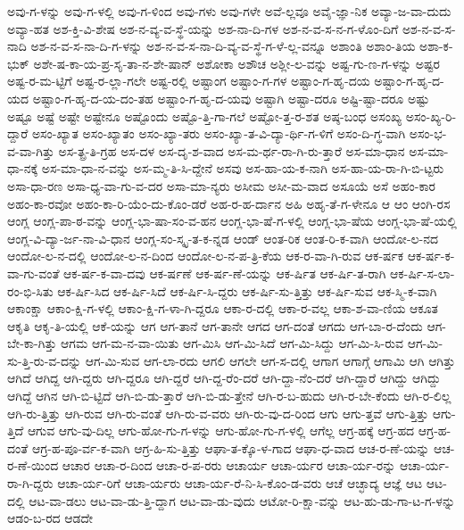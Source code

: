 {ಅವು-ಗ-ಳನ್ನು
ಅವು-ಗ-ಳಲ್ಲಿ
ಅವು-ಗ-ಳಿಂದ
ಅವು-ಗಳು
ಅವು-ಗಳೇ
ಅವೆ-ಲ್ಲವೂ
ಅವೈ-ಜ್ಞಾ-ನಿಕ
ಅವ್ಯಾ-ಜ-ವಾ-ದುದು
ಅವ್ಯಾ-ಹತ
ಅಶ-ಕ್ತಿ-ವಿ-ಶೇಷ
ಅಶ-ನ-ವ್ಯ-ವ-ಸ್ಥೆ-ಯನ್ನು
ಅಶ-ನಾ-ದಿ-ಗಳ
ಅಶ-ನ-ವ-ಸ-ನ-ಗ-ಳೊಂ-ದಿಗೆ
ಅಶ-ನ-ವ-ಸ-ನಾದಿ
ಅಶ-ನ-ವ-ಸ-ನಾ-ದಿ-ಗ-ಳನ್ನು
ಅಶ-ನ-ವ-ಸ-ನಾ-ದಿ-ವ್ಯ-ವ-ಸ್ಥೆ-ಗ-ಳೆ-ಲ್ಲ-ವನ್ನೂ
ಅಶಾಂತಿ
ಅಶಾಂ-ತಿಯ
ಅಶಾ-ಕ-ಭುಕ್
ಅಶೇ-ಷ-ಕಾ-ಯ-ಪ್ರ-ಸೃ-ತಾ-ನ-ಶೇ-ಷಾನ್
ಅಶೋಕಾ
ಅಶೌಚ
ಅಶ್ಲೀ-ಲ-ವನ್ನು
ಅಷ್ಟ-ಗು-ಣ-ಗ-ಳನ್ನು
ಅಷ್ಟರ
ಅಷ್ಟ-ರ-ಮ-ಟ್ಟಿಗೆ
ಅಷ್ಟ-ರ-ಲ್ಲಾ-ಗಲೇ
ಅಷ್ಟ-ರಲ್ಲಿ
ಅಷ್ಟಾಂಗ
ಅಷ್ಟಾಂ-ಗ-ಗಳ
ಅಷ್ಟಾಂ-ಗ-ಹೃ-ದಯ
ಅಷ್ಟಾಂ-ಗ-ಹೃ-ದ-ಯದ
ಅಷ್ಟಾಂ-ಗ-ಹೃ-ದ-ಯ-ದಂ-ತಹ
ಅಷ್ಟಾಂ-ಗ-ಹೃ-ದ-ಯವು
ಅಷ್ಟಾಗಿ
ಅಷ್ಟಾ-ದರೂ
ಅಷ್ಟಿ-ಷ್ಟಾ-ದರೂ
ಅಷ್ಟು
ಅಷ್ಟೂ
ಅಷ್ಟೆ
ಅಷ್ಟೇ
ಅಷ್ಟೇನೂ
ಅಷ್ಟೊಂದು
ಅಷ್ಟೊ-ತ್ತಿ-ಗಾ-ಗಲೆ
ಅಷ್ಟೋ-ತ್ತ-ರ-ಶತ
ಅಷ್ಠ-ಬಂಧ
ಅಸಂಖ್ಯ
ಅಸಂ-ಖ್ಯ-ರಿ-ದ್ದಾರೆ
ಅಸಂ-ಖ್ಯಾತ
ಅಸಂ-ಖ್ಯಾತಂ
ಅಸಂ-ಖ್ಯಾ-ತರು
ಅಸಂ-ಖ್ಯಾ-ತ-ವಿ-ದ್ಯಾ-ರ್ಥಿ-ಗ-ಳಿಗೆ
ಅಸಂ-ದಿ-ಗ್ಧ-ವಾಗಿ
ಅಸಂ-ಭ-ವ-ವಾ-ಗಿತ್ತು
ಅಸ-ತ್ಪ್ರ-ತಿ-ಗ್ರಹ
ಅಸ-ದಳ
ಅಸ-ದೃ-ಶ-ವಾದ
ಅಸ-ಮ-ರ್ಥ-ರಾ-ಗಿ-ರು-ತ್ತಾರೆ
ಅಸ-ಮಾ-ಧಾನ
ಅಸ-ಮಾ-ಧಾ-ನಕ್ಕೆ
ಅಸ-ಮಾ-ಧಾ-ನ-ವನ್ನು
ಅಸ-ಮ್ಮ-ತಿ-ಸಿ-ದ್ದೇನೆ
ಅಸವು
ಅಸ-ಹಾ-ಯ-ಕ-ನಾಗಿ
ಅಸ-ಹಾ-ಯ-ರಾ-ಗಿ-ಬಿ-ಟ್ಟರು
ಅಸಾ-ಧಾ-ರಣ
ಅಸಾ-ಧ್ಯ-ವಾ-ಗು-ವ-ದರ
ಅಸಾ-ಮಾ-ನ್ಯರು
ಅಸೀಮ
ಅಸೀ-ಮ-ವಾದ
ಅಸೂಯೆ
ಅಸೆ
ಅಹಂ-ಕಾರ
ಅಹಂ-ಕಾ-ರವೋ
ಅಹಂ-ಕಾ-ರಿ-ಯೆಂ-ದು-ಕೊಂ-ಡರೆ
ಅಹ-ರ-ಹ-ರ್ದಾನ
ಅಹಿ
ಅಹೃ-ತೆ-ಗ-ಳೇನೂ
ಆ
ಆಂ
ಆಂಗಿ-ರಸ
ಆಂಗ್ಲ
ಆಂಗ್ಲ-ಪಾ-ಠ-ವನ್ನು
ಆಂಗ್ಲ-ಭಾ-ಷಾ-ಸಂ-ವ-ಹನ
ಆಂಗ್ಲ-ಭಾ-ಷೆ-ಗ-ಳಲ್ಲಿ
ಆಂಗ್ಲ-ಭಾ-ಷೆಯ
ಆಂಗ್ಲ-ಭಾ-ಷೆ-ಯಲ್ಲಿ
ಆಂಗ್ಲ-ವಿ-ದ್ಯಾ-ರ್ಜ-ನಾ-ವಿ-ಧಾನ
ಆಂಗ್ಲ-ಸಂ-ಸ್ಕೃ-ತ-ಕ-ನ್ನಡ
ಆಂಡ್
ಆಂತ-ರಿಕ
ಆಂತ-ರಿ-ಕ-ವಾಗಿ
ಆಂದೋ-ಲ-ನದ
ಆಂದೋ-ಲ-ನ-ದಲ್ಲಿ
ಆಂದೋ-ಲ-ನ-ದಿಂದ
ಆಂದೋ-ಲ-ನ-ಪ-ತ್ರಿ-ಕೆಯ
ಆಕ-ರ-ವಾ-ಗಿ-ರುವ
ಆಕ-ರ್ಷಕ
ಆಕ-ರ್ಷ-ಕ-ವಾ-ಗು-ವಂತೆ
ಆಕ-ರ್ಷ-ಕ-ವಾ-ದವು
ಆಕ-ರ್ಷಣೆ
ಆಕ-ರ್ಷ-ಣೆ-ಯನ್ನು
ಆಕ-ರ್ಷಿತ
ಆಕ-ರ್ಷಿ-ತ-ರಾಗಿ
ಆಕ-ರ್ಷಿ-ಸ-ಲಾ-ರಂ-ಭಿ-ಸಿತು
ಆಕ-ರ್ಷಿ-ಸಿದ
ಆಕ-ರ್ಷಿ-ಸಿದೆ
ಆಕ-ರ್ಷಿ-ಸಿ-ದ್ದರು
ಆಕ-ರ್ಷಿ-ಸು-ತ್ತಿತ್ತು
ಆಕ-ರ್ಷಿ-ಸುವ
ಆಕ-ಸ್ಮಿ-ಕ-ವಾಗಿ
ಆಕಾಂಕ್ಷಾ
ಆಕಾಂ-ಕ್ಷಿ-ಗ-ಳಲ್ಲಿ
ಆಕಾಂ-ಕ್ಷಿ-ಗ-ಳಾ-ಗಿ-ದ್ದರೂ
ಆಕಾ-ರ-ದಲ್ಲಿ
ಆಕಾ-ರ-ವಲ್ಲ
ಆಕಾ-ಶ-ವಾ-ಣಿಯ
ಆಕೂತ
ಆಕೃತಿ
ಆಕೃ-ತಿ-ಯಲ್ಲಿ
ಆಕೆ-ಯನ್ನು
ಆಗ
ಆಗ-ತಾನೆ
ಆಗ-ತಾನೇ
ಆಗದ
ಆಗ-ದಂತೆ
ಆಗದು
ಆಗ-ಬಾ-ರ-ದೆಂದು
ಆಗ-ಬೇ-ಕಾ-ಗಿತ್ತು
ಆಗಮ
ಆಗ-ಮ-ನ-ವಾ-ಯಿತು
ಆಗ-ಮಿಸಿ
ಆಗ-ಮಿ-ಸಿದೆ
ಆಗ-ಮಿ-ಸಿದ್ದು
ಆಗ-ಮಿ-ಸಿ-ರುವ
ಆಗ-ಮಿ-ಸು-ತ್ತಿ-ರು-ವ-ದನ್ನು
ಆಗ-ಮಿ-ಸುವ
ಆಗ-ಲಾ-ರದು
ಆಗಲಿ
ಆಗಲೇ
ಆಗ-ಸ-ದಲ್ಲಿ
ಆಗಾಗ
ಆಗಾಗ್ಗೆ
ಆಗಾಮಿ
ಆಗಿ
ಆಗಿತ್ತು
ಆಗಿದೆ
ಆಗಿದ್ದ
ಆಗಿ-ದ್ದರು
ಆಗಿ-ದ್ದರೂ
ಆಗಿ-ದ್ದರೆ
ಆಗಿ-ದ್ದ-ರೆಂ-ದರೆ
ಆಗಿ-ದ್ದಾ-ನೆಂ-ದರೆ
ಆಗಿ-ದ್ದಾರೆ
ಆಗಿದ್ದು
ಆಗಿದ್ದು
ಆಗಿದ್ದೆ
ಆಗಿನ
ಆಗಿ-ಬಿ-ಟ್ಟಿದೆ
ಆಗಿ-ಬಿ-ಡು-ತ್ತಾರೆ
ಆಗಿ-ಬಿ-ಡು-ತ್ತೇನೆ
ಆಗಿ-ರ-ಬ-ಹುದು
ಆಗಿ-ರ-ಬೇ-ಕೆಂದು
ಆಗಿ-ರ-ಲಿಲ್ಲ
ಆಗಿ-ರು-ತ್ತಿತ್ತು
ಆಗಿ-ರುವ
ಆಗಿ-ರು-ವಂತೆ
ಆಗಿ-ರು-ವ-ವರು
ಆಗಿ-ರು-ವು-ದ-ರಿಂದ
ಆಗು
ಆಗು-ತ್ತವೆ
ಆಗು-ತ್ತಿತ್ತು
ಆಗು-ತ್ತಿದೆ
ಆಗುವ
ಆಗು-ವು-ದಿಲ್ಲ
ಆಗು-ಹೋ-ಗು-ಗ-ಳನ್ನು
ಆಗು-ಹೋ-ಗು-ಗ-ಳಲ್ಲಿ
ಆಗೆಲ್ಲ
ಆಗ್ರ-ಹಕ್ಕೆ
ಆಗ್ರ-ಹದ
ಆಗ್ರ-ಹ-ದಂತೆ
ಆಗ್ರ-ಹ-ಪೂ-ರ್ವ-ಕ-ವಾಗಿ
ಆಗ್ರ-ಹಿ-ಸು-ತ್ತಿತ್ತು
ಆಘಾ-ತ-ಕ್ಕೊ-ಳ-ಗಾದ
ಆಘಾ-ಧ-ವಾದ
ಆಚ-ರ-ಣೆ-ಯನ್ನು
ಆಚ-ರ-ಣೆ-ಯಿಂದ
ಆಚಾರ
ಆಚಾ-ರ-ದಿಂದ
ಆಚಾ-ರ-ಪ-ರರು
ಆಚಾರ್ಯ
ಆಚಾ-ರ್ಯರ
ಆಚಾ-ರ್ಯ-ರನ್ನು
ಆಚಾ-ರ್ಯ-ರಾ-ಗಿ-ದ್ದರು
ಆಚಾ-ರ್ಯ-ರಿಗೆ
ಆಚಾ-ರ್ಯರು
ಆಚಾ-ರ್ಯ-ರೆ-ನಿ-ಸಿ-ಕೊಂ-ಡ-ವರು
ಆಚೆ
ಆಚ್ಛಾದ್ಯ
ಆಜ್ಞೆ
ಆಟ
ಆಟ-ದಲ್ಲಿ
ಆಟ-ವಾ-ಡಲು
ಆಟ-ವಾ-ಡು-ತ್ತಿ-ದ್ದಾಗ
ಆಟ-ವಾ-ಡು-ವುದು
ಆಟೋ-ರಿ-ಕ್ಷಾ-ವನ್ನು
ಆಟ-ಹು-ಡು-ಗಾ-ಟ-ಗ-ಳನ್ನು
ಆಡಂ-ಬ-ರದ
ಆಡದೇ
}
